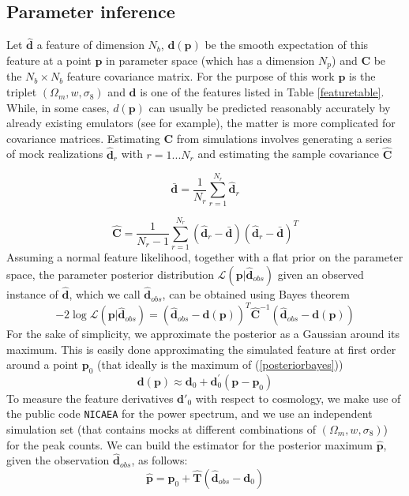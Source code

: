 \documentclass[reprint,aps,prd,superscriptaddress,showkeys,showpacs]{revtex4-1}
\newcommand{\bb}[1]{\mathbf{#1}}
\newcommand{\bbh}[1]{\mathbf{\hat{#1}}}
\begin{document}
\subsection{Parameter inference}
%
Let $\bbh{d}$ a feature of dimension $N_b$, $\bb{d}(\bb{p})$ be the smooth expectation of this feature at a point $\bb{p}$ in parameter space (which has a dimension $N_p$) and $\bb{C}$ be the $N_b\times N_b$ feature covariance matrix. For the purpose of this work $\bb{p}$ is the triplet $(\Omega_m,w,\sigma_8)$ and $\bb{d}$ is one of the features listed in Table \ref{featuretable}. While, in some cases, $d(\bb{p})$ can usually be predicted reasonably accurately by already existing emulators (see \citep{coyote2,Nicaea} for example), the matter is more complicated for covariance matrices. Estimating $\bb{C}$ from simulations involves generating a series of mock realizations $\bbh{d}_r$ with $r=1...N_r$ and estimating the sample covariance $\bbh{C}$

\begin{equation}
\bb{\bar{d}} = \frac{1}{N_r}\sum_{r=1}^{N_r} \bbh{d}_r
\end{equation}

\begin{equation}
\label{covest}
\bbh{C} = \frac{1}{N_r-1}\sum_{r=1}^{N_r} (\bbh{d}_r - \bar{\bb{d}}) (\bbh{d}_r - \bar{\bb{d}})^T
\end{equation}
%
Assuming a normal feature likelihood, together with a flat prior on the parameter space, the parameter posterior distribution $\mathcal{L}(\bb{p}\vert\bbh{d}_{obs})$ given an observed instance of $\bbh{d}$, which we call $\bbh{d}_{obs}$, can be obtained using Bayes theorem
\begin{equation}
\label{posteriorbayes}
-2\log\mathcal{L}(\bb{p}\vert\bbh{d}_{obs}) = (\bbh{d}_{obs}-\bb{d}(\bb{p}))^T\bbh{C}^{-1}(\bbh{d}_{obs}-\bb{d}(\bb{p}))
\end{equation}
%
For the sake of simplicity, we approximate the posterior as a Gaussian around its maximum. This is easily done approximating the simulated feature at first order around a point $\bb{p}_0$ (that ideally is the maximum of (\ref{posteriorbayes}))
\begin{equation}
\bb{d}(\bb{p}) \approx \bb{d}_0 + \bb{d}_0^\prime(\bb{p}-\bb{p}_0) 
\end{equation}
%
To measure the feature derivatives $\bb{d}'_0$ with respect to cosmology, we make use of the public code \texttt{NICAEA} \citep{Nicaea} for the power spectrum, and we use an independent simulation set (that contains mocks at different combinations of $(\Omega_m,w,\sigma_8)$) for the peak counts.
We can build the estimator for the posterior maximum $\bbh{p}$, given the observation $\bbh{d}_{obs}$, as follows:
%
\begin{equation}
\label{estimatormean}
\bbh{p} = \bb{p}_0 + \bbh{T}(\bbh{d}_{obs}-\bb{d}_0)
\end{equation}
\end{document}
